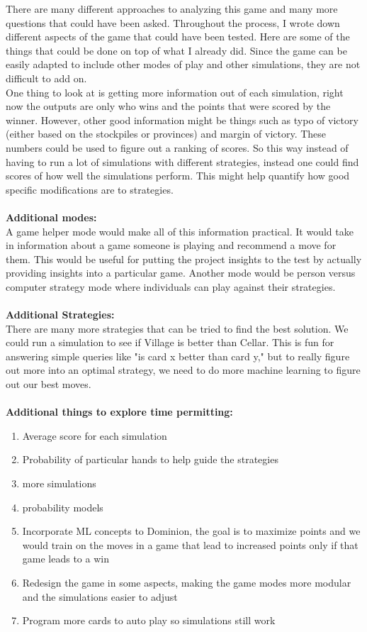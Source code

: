 \documentclass[11pt, oneside]{article}   	%
\begin{document}
There are many different approaches to analyzing this game and many more questions that could have been asked. Throughout the process, I wrote down different aspects of the game that could have been tested. Here are some of the things that could be done on top of what I already did. Since the game can be easily adapted to include other modes of play and other simulations, they are not difficult to add on. \\

One thing to look at is getting more information out of each simulation, right now the outputs are only who wins and the points that were scored by the winner. However, other good information might be things such as typo of victory (either based on the stockpiles or provinces) and margin of victory. These numbers could be used to figure out a ranking of scores. So this way instead of having to run a lot of simulations with different strategies, instead one could find scores of how well the simulations perform. This might help quantify how good specific modifications are to strategies. 
\\
\\
\textbf{Additional modes:}\\
A game helper mode would make all of this information practical. It would take in information about a game someone is playing and recommend a move for them. This would be useful for putting the project insights to the test by actually providing insights into a particular game. Another mode would be person versus computer strategy mode where individuals can play against their strategies. 
\\
\\
\textbf{Additional Strategies:}\\
There are many more strategies that can be tried to find the best solution. We could run a simulation to see if Village is better than Cellar. This is fun for answering simple queries like "is card x better than card y," but to really figure out more into an optimal strategy, we need to do more machine learning to figure out our best moves. 
\\
\\
\textbf{Additional things to explore time permitting:}\\
	\begin{enumerate}
 		 \item Average score for each simulation
		 \item Probability of particular hands to help guide the strategies
		 \item more simulations
		 \item probability models
		 \item Incorporate ML concepts  to Dominion, the goal is to maximize points and we would train on the moves in a game that lead to increased points only if that game leads to a win
		 \item Redesign the game in some aspects, making the game modes more modular and the simulations easier to adjust
		 \item Program more cards to auto play so simulations still work
	\end{enumerate}
	
\end{document}
